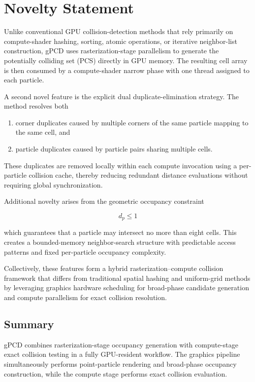 \section{Novelty Statement}

Unlike conventional GPU collision-detection methods that rely primarily on compute-shader hashing, sorting, atomic operations, or iterative neighbor-list construction, gPCD uses rasterization-stage parallelism to generate the potentially colliding set (PCS) directly in GPU memory. The resulting cell array is then consumed by a compute-shader narrow phase with one thread assigned to each particle.

A second novel feature is the explicit dual duplicate-elimination strategy. The method resolves both

\begin{enumerate}
    \item corner duplicates caused by multiple corners of the same particle mapping to the same cell, and
    \item particle duplicates caused by particle pairs sharing multiple cells.
\end{enumerate}

These duplicates are removed locally within each compute invocation using a per-particle collision cache, thereby reducing redundant distance evaluations without requiring global synchronization.

Additional novelty arises from the geometric occupancy constraint

\[
d_p \leq 1
\]

which guarantees that a particle may intersect no more than eight cells. This creates a bounded-memory neighbor-search structure with predictable access patterns and fixed per-particle occupancy complexity.

Collectively, these features form a hybrid rasterization--compute collision framework that differs from traditional spatial hashing and uniform-grid methods by leveraging graphics hardware scheduling for broad-phase candidate generation and compute parallelism for exact collision resolution.

\subsection{Summary}

gPCD combines rasterization-stage occupancy generation with compute-stage exact collision testing in a fully GPU-resident workflow. The graphics pipeline simultaneously performs point-particle rendering and broad-phase occupancy construction, while the compute stage performs exact collision evaluation.
